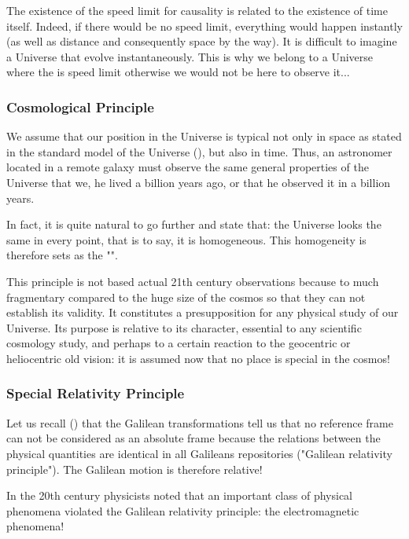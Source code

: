 	The existence of the speed limit for causality is related to the existence of time itself. Indeed, if there would be no speed limit, everything would happen instantly (as well as distance and consequently space by the way). It is difficult to imagine a Universe that evolve instantaneously. This is why we belong to a Universe where the is speed limit otherwise we would not be here to observe it...
	
	\subsubsection{Cosmological Principle}
	We assume that our position in the Universe is typical not only in space as stated in the standard model of the Universe (), but also in time. Thus, an astronomer located in a remote galaxy must observe the same general properties of the Universe that we, he lived a billion years ago, or that he observed it in a billion years.
	
	In fact, it is quite natural to go further and state that: the Universe looks the same in every point, that is to say, it is homogeneous. This homogeneity is therefore sets as the "".
	
	This principle is not based actual 21th century observations because to much fragmentary compared to the huge size of the cosmos so that they can not establish its validity. It constitutes a presupposition for any physical study of our Universe. Its purpose is relative to its character, essential to any scientific cosmology study, and perhaps to a certain reaction to the geocentric or heliocentric old vision: it is assumed now that no place is special in the cosmos!
	
	\subsubsection{Special Relativity Principle}\label{special relativity principle}
	Let us recall () that the Galilean transformations tell us that no reference frame can not be considered as an absolute frame because the relations between the physical quantities are identical in all Galileans repositories ("Galilean relativity principle"). The Galilean motion is therefore relative!
	
	In the 20th century physicists noted that an important class of physical phenomena violated the Galilean relativity principle: the electromagnetic phenomena!
	
